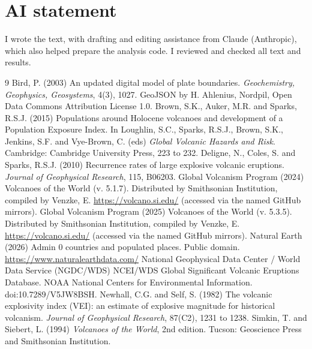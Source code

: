 \documentclass[11pt,a4paper]{article}
\begin{document}
\section*{AI statement}
I wrote the text, with drafting and editing assistance from Claude (Anthropic), which also helped prepare the analysis code. I reviewed and checked all text and results.

\begin{thebibliography}{9}
 Bird, P. (2003) An updated digital model of plate boundaries. \emph{Geochemistry, Geophysics, Geosystems}, 4(3), 1027. GeoJSON by H. Ahlenius, Nordpil, Open Data Commons Attribution License 1.0.
 Brown, S.K., Auker, M.R. and Sparks, R.S.J. (2015) Populations around Holocene volcanoes and development of a Population Exposure Index. In Loughlin, S.C., Sparks, R.S.J., Brown, S.K., Jenkins, S.F. and Vye-Brown, C. (eds) \emph{Global Volcanic Hazards and Risk}. Cambridge: Cambridge University Press, 223 to 232.
 Deligne, N., Coles, S. and Sparks, R.S.J. (2010) Recurrence rates of large explosive volcanic eruptions. \emph{Journal of Geophysical Research}, 115, B06203.
 Global Volcanism Program (2024) Volcanoes of the World (v. 5.1.7). Distributed by Smithsonian Institution, compiled by Venzke, E. \url{https://volcano.si.edu/} (accessed via the named GitHub mirrors).
 Global Volcanism Program (2025) Volcanoes of the World (v. 5.3.5). Distributed by Smithsonian Institution, compiled by Venzke, E. \url{https://volcano.si.edu/} (accessed via the named GitHub mirrors).
 Natural Earth (2026) Admin 0 countries and populated places. Public domain. \url{https://www.naturalearthdata.com/}
 National Geophysical Data Center / World Data Service (NGDC/WDS) NCEI/WDS Global Significant Volcanic Eruptions Database. NOAA National Centers for Environmental Information. doi:10.7289/V5JW8BSH.
 Newhall, C.G. and Self, S. (1982) The volcanic explosivity index (VEI): an estimate of explosive magnitude for historical volcanism. \emph{Journal of Geophysical Research}, 87(C2), 1231 to 1238.
 Simkin, T. and Siebert, L. (1994) \emph{Volcanoes of the World}, 2nd edition. Tucson: Geoscience Press and Smithsonian Institution.
\end{thebibliography}
\end{document}
